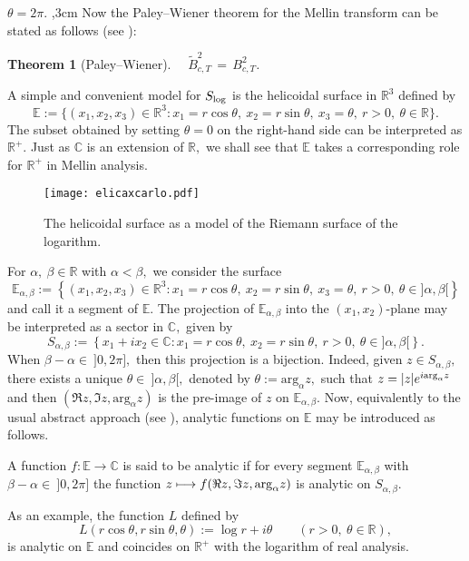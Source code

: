 \documentclass[amsmath,english,a4paper,graphicx,12pt]{article}
\begin{document}
$\theta=2\pi$.
,3cm
Now the Paley--Wiener theorem for the Mellin transform can be
stated as follows (see \cite{BBMS}):
\newtheorem{Theorem}{Theorem}
\begin{Theorem}[Paley--Wiener] \label{pw0}
$\quad \widetilde{B}^2_{c,T} \,=\,
B^2_{c,T}$.
\end{Theorem}
 \noindent
A simple and convenient model for $S_{{\rm log}}$ is the helicoidal surface in $\mathbb{R}^3$ defined by
$$ \mathbb{E}:= \{ (x_1,x_2,x_3) \in \mathbb{R}^3 : x_1= r \cos \theta,~ x_2= r\sin \theta,~x_3=\theta,~ r>0, ~\theta\in \mathbb{R}\}.$$
The subset obtained by setting $\theta =0$ on the right-hand side can be interpreted as $\mathbb{R}^+.$
Just as $\mathbb{C}$ is an extension of  $\mathbb{R},$ we shall see that  $\mathbb{E}$ takes a corresponding role for $\mathbb{R}^+$ in Mellin analysis.
\begin{figure}[htbp] 
\begin{center}
\texttt{[image: elicaxcarlo.pdf]}
\hskip0.2cm
\end{center}
\caption{\small The helicoidal surface as a model of the Riemann surface of the logarithm.}\label{helix}
\end{figure}
For $\alpha,~\beta\in \mathbb{R}$ with $\alpha<\beta,$ we consider the surface
$$\mathbb{E}_{\alpha,\beta}:= \left\{(x_1,x_2,x_3) \in \mathbb{R}^3 : x_1= r \cos \theta,~ x_2= r\sin \theta,~x_3=\theta,~ r>0, ~\theta\in {]}\alpha,\beta{[}\right\}$$
and call it a segment of $\mathbb{E}.$ The projection of $\mathbb{E}_{\alpha,\beta}$ into the $(x_1,x_2)$-plane may be interpreted as a sector in $\mathbb{C},$ given by
$$ S_{\alpha,\beta}:= \left\{ x_1 +ix_2 \in \mathbb{C} : x_1= r\cos\theta,~ x_2=r\sin \theta,~ r>0,~ \theta\in {]}\alpha,\beta{[} \right\}.$$
When $\beta -\alpha \in~{]}0, 2\pi],$ then this projection is a bijection. Indeed, given $z\in  S_{\alpha,\beta},$ there exists a unique $\theta\in~ {]}\alpha,\beta{[},$ denoted by $\theta:= \mbox{arg}_\alpha z,$ such that $z= |z| e^{i {\rm arg}_\alpha z}$ and then  $(\Re z, \Im z  ,\mbox{arg}_\alpha z)$ is the pre-image of $z$ on $\mathbb{E}_{\alpha,\beta}.$
Now, equivalently to the usual abstract approach (see \cite{BBMS}), analytic functions on $ \mathbb{E}$ may be introduced as follows.
\begin{Definition}\label{def3}
A function $f: \mathbb{E} \rightarrow \mathbb{C}$ is said to be {\rm analytic} if for every segment 
$\mathbb{E}_{\alpha,\beta}$ with $\beta-\alpha\in~]0, 2\pi]$ the function $z\longmapsto f(\Re z, \Im z, {\rm arg}_\alpha z)$ is analytic on $S_{\alpha,\beta}.$
\end{Definition}
As an example, the function $L$ defined by
$$ L(r\cos \theta, r\sin \theta, \theta):= \log r+i \theta \quad \quad (r>0,~ \theta \in \mathbb{R}),$$
is analytic on $\mathbb{E}$ and coincides on $\mathbb{R}^+$ with the logarithm of real analysis.
\end{document}
